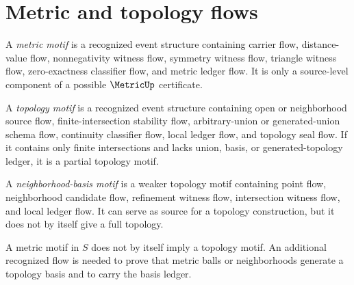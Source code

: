 \section{Metric and topology flows}
\label{sec:higher-case-metric-topology}

\begin{definition}
\label{def:higher-case-metric-motif}
A \emph{metric motif} is a recognized event structure containing carrier flow, distance-value flow, nonnegativity witness flow, symmetry witness flow, triangle witness flow, zero-exactness classifier flow, and metric ledger flow. It is only a source-level component of a possible $\MetricUp$ certificate.
\end{definition}

\begin{definition}
\label{def:higher-case-topology-motif}
A \emph{topology motif} is a recognized event structure containing open or neighborhood source flow, finite-intersection stability flow, arbitrary-union or generated-union schema flow, continuity classifier flow, local ledger flow, and topology seal flow. If it contains only finite intersections and lacks union, basis, or generated-topology ledger, it is a partial topology motif.
\end{definition}

\begin{definition}
\label{def:higher-case-neighborhood-basis-motif}
A \emph{neighborhood-basis motif} is a weaker topology motif containing point flow, neighborhood candidate flow, refinement witness flow, intersection witness flow, and local ledger flow. It can serve as source for a topology construction, but it does not by itself give a full topology.
\end{definition}

\begin{proposition}
\label{prop:higher-case-metric-to-topology-needs-cert}
A metric motif in $S$ does not by itself imply a topology motif. An additional recognized flow is needed to prove that metric balls or neighborhoods generate a topology basis and to carry the basis ledger.
\end{proposition}


